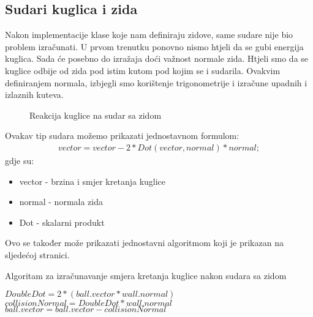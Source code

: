 \subsection{Sudari kuglica i zida}
Nakon implementacije klase koje nam definiraju zidove, same sudare nije bio problem izračunati. U prvom trenutku ponovno nismo htjeli da se gubi energija kuglica. Sada će posebno do izražaja doći važnost normale zida. Htjeli smo da se kuglice odbije od zida pod istim kutom pod kojim se i sudarila. Ovakvim definiranjem normala, izbjegli smo korištenje trigonometrije i izračune upadnih i izlaznih kuteva.
\begin{figure}[!http]
	\begin{center}
	\end{center}
	\caption {Reakcija kuglice na sudar sa zidom}
	\label{fig:21}
\end{figure}
Ovakav tip sudara možemo prikazati jednostavnom formulom:
\begin{equation}\label{equ:wall_collision}
		\begin{aligned}
			vector = vector - 2 * Dot(vector, normal) * normal;
		\end{aligned}
\end{equation}
gdje su:
\begin{itemize}
	\item vector - brzina i smjer kretanja kuglice
	\item normal - normala zida
	\item Dot - skalarni produkt
\end{itemize}
Ovo se također može prikazati jednostavni algoritmom koji je prikazan na sljedećoj stranici.\newpage
\begin{algorithm}
	\caption{Algoritam za izračunavanje smjera kretanja kuglice nakon sudara sa zidom}
	\label{alg:resolve_Wallcollision}
	\begin{algorithmic}
		\Return
		\EndIf
		\State $DoubleDot = 2 * (ball.vector * wall.normal)$
		\State $collisionNormal = DoubleDot * wall.normal$
		\State $ball.vector = ball.vector - collisionNormal$
		\EndFunction
	\end{algorithmic}
\end{algorithm}

